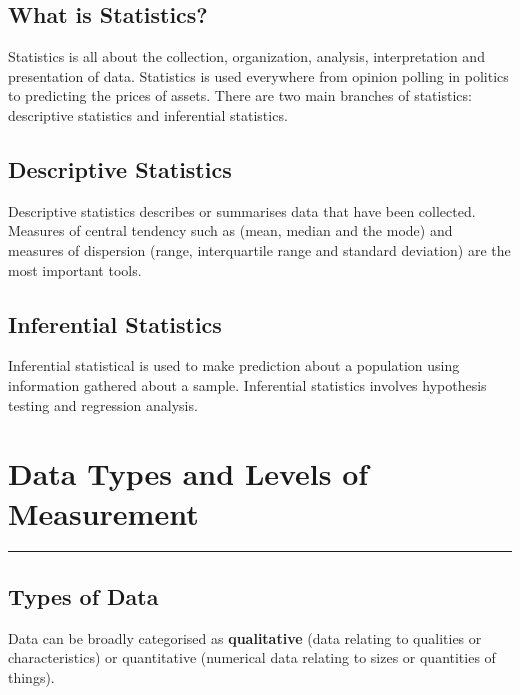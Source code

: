 \documentclass[
]{book}
\begin{document}
\hypertarget{what-is-statistics}{%
\section{What is Statistics?}\label{what-is-statistics}}

Statistics is all about the collection, organization, analysis, interpretation and presentation of data. Statistics is used everywhere from opinion polling in politics to predicting the prices of assets. There are two main branches of statistics: descriptive statistics and inferential statistics.

\hypertarget{descriptive-statistics}{%
\section{Descriptive Statistics}\label{descriptive-statistics}}

Descriptive statistics describes or summarises data that have been collected. Measures of central tendency such as (mean, median and the mode) and measures of dispersion (range, interquartile range and standard deviation) are the most important tools.

\hypertarget{inferential-statistics}{%
\section{Inferential Statistics}\label{inferential-statistics}}

Inferential statistical is used to make prediction about a population using information gathered about a sample. Inferential statistics involves hypothesis testing and regression analysis.

\hypertarget{data-types-and-levels-of-measurement}{%
\chapter{Data Types and Levels of Measurement}\label{data-types-and-levels-of-measurement}}

\begin{center}\rule{0.5\linewidth}{0.5pt}\end{center}

\hypertarget{types-of-data}{%
\section{Types of Data}\label{types-of-data}}

Data can be broadly categorised as \textbf{qualitative} (data relating to qualities or characteristics) or quantitative (numerical data relating to sizes or quantities of things).
\end{document}
